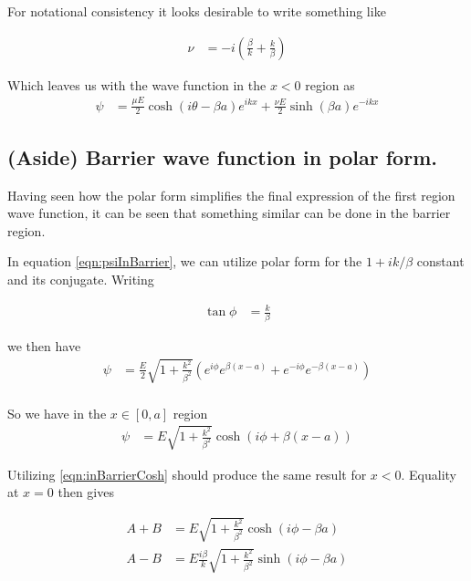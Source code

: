 \documentclass{article}
\begin{document}
For notational consistency it looks desirable to write something like

\begin{align}\label{eqn:nuDefined}
\nu &= -i \left(\frac{\beta}{k} + \frac{k}{\beta} \right) 
\end{align}

Which leaves us with the wave function in the $x<0$ region as
\begin{align}\label{eqn:incidentAndReflected}
\psi &=
\frac{\mu E}{2}\cosh\left( i\theta -\beta a \right) e^{ i k x }
+\frac{\nu E}{2}\sinh\left( \beta a \right) e^{ -i k x }
\end{align}

\subsection{ (Aside) Barrier wave function in polar form. }

Having seen how the polar form simplifies the final expression of the first region wave function, it can be seen that 
something similar can be done in the barrier region.  

In equation \ref{eqn:psiInBarrier}, we can utilize polar form for the $1+ik/\beta$ constant and its conjugate.  Writing

\begin{align*}
\tan\phi &= \frac{k}{\beta}
\end{align*}

we then have
\begin{align*}
\psi 
&=
\frac{E}{2}\sqrt{1 + \frac{k^2}{\beta^2}} \left( e^{i\phi} e^{ \beta(x-a)} + e^{-i\phi} e^{ -\beta(x-a)} \right) \\
\end{align*}

So we have in the $x \in [0,a]$ region
\begin{align}\label{eqn:inBarrierCosh}
\psi &= E \sqrt{1 + \frac{k^2}{\beta^2}} \cosh\left( i\phi + \beta(x-a) \right) 
\end{align}

Utilizing 
\ref{eqn:inBarrierCosh}
should produce the same result for $x<0$.  Equality at $x=0$ then gives

\begin{align*}
A + B &= E \sqrt{1 + \frac{k^2}{\beta^2}} \cosh\left( i\phi -\beta a \right) \\
A - B &= E \frac{i\beta}{k} \sqrt{1 + \frac{k^2}{\beta^2}} \sinh\left( i\phi -\beta a \right) \\
\end{align*}
\end{document}
